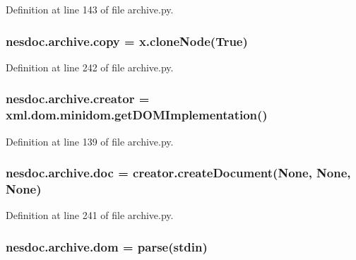 Definition at line 143 of file archive.\+py.

\subsubsection[{\texorpdfstring{copy}{copy}}]{\setlength{\rightskip}{0pt plus 5cm}nesdoc.\+archive.\+copy = x.\+clone\+Node(True)}\hypertarget{namespacenesdoc_1_1archive_a277234d1849fb06e8d6df199f2445812}{}\label{namespacenesdoc_1_1archive_a277234d1849fb06e8d6df199f2445812}


Definition at line 242 of file archive.\+py.

\subsubsection[{\texorpdfstring{creator}{creator}}]{\setlength{\rightskip}{0pt plus 5cm}nesdoc.\+archive.\+creator = xml.\+dom.\+minidom.\+get\+D\+O\+M\+Implementation()}\hypertarget{namespacenesdoc_1_1archive_a3513e932db34a29962898805cc7e7993}{}\label{namespacenesdoc_1_1archive_a3513e932db34a29962898805cc7e7993}


Definition at line 139 of file archive.\+py.

\subsubsection[{\texorpdfstring{doc}{doc}}]{\setlength{\rightskip}{0pt plus 5cm}nesdoc.\+archive.\+doc = creator.\+create\+Document(None, None, None)}\hypertarget{namespacenesdoc_1_1archive_ad9eceac7bc9fbf7cc8ae91ee16f5b1bc}{}\label{namespacenesdoc_1_1archive_ad9eceac7bc9fbf7cc8ae91ee16f5b1bc}


Definition at line 241 of file archive.\+py.

\subsubsection[{\texorpdfstring{dom}{dom}}]{\setlength{\rightskip}{0pt plus 5cm}nesdoc.\+archive.\+dom = parse(stdin)}\hypertarget{namespacenesdoc_1_1archive_a9447d2728dbdda43111396d792a51c52}{}\label{namespacenesdoc_1_1archive_a9447d2728dbdda43111396d792a51c52}


